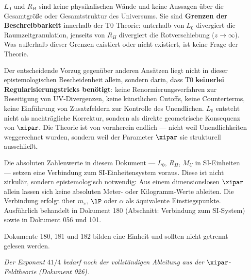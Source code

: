 \begin{foundation}
$L_0$ und $R_H$ sind keine physikalischen Wände und keine Aussagen über die Gesamtgröße oder Gesamtstruktur des Universums. Sie sind \textbf{Grenzen der Beschreibbarkeit} innerhalb der T0-Theorie: unterhalb von $L_0$ divergiert die Raumzeitgranulation, jenseits von $R_H$ divergiert die Rotverschiebung ($z \to \infty$). Was außerhalb dieser Grenzen existiert oder nicht existiert, ist keine Frage der Theorie.

Der entscheidende Vorzug gegenüber anderen Ansätzen liegt nicht in dieser epistemologischen Bescheidenheit allein, sondern darin, dass T0 \textbf{keinerlei Regularisierungstricks benötigt}: keine Renormierungsverfahren zur Beseitigung von UV-Divergenzen, keine künstlichen Cutoffs, keine Counterterms, keine Einführung von Zusatzfeldern zur Kontrolle des Unendlichen. $L_0$ entsteht nicht als nachträgliche Korrektur, sondern als direkte geometrische Konsequenz von $\xipar$. Die Theorie ist von vornherein endlich — nicht weil Unendlichkeiten weggerechnet wurden, sondern weil der Parameter $\xipar$ sie strukturell ausschließt.
\end{foundation}

\begin{foundation}
Die absoluten Zahlenwerte in diesem Dokument — $L_0$, $R_H$, $M_U$ in SI-Einheiten — setzen eine Verbindung zum SI-Einheitensystem voraus. Diese ist nicht zirkulär, sondern epistemologisch notwendig: Aus einem dimensionslosen $\xipar$ allein lassen sich keine absoluten Meter- oder Kilogramm-Werte ableiten. Die Verbindung erfolgt über $m_e$, $\lP$ oder $\alpha$ als äquivalente Einstiegspunkte. Ausführlich behandelt in Dokument 180 (Abschnitt: Verbindung zum SI-System) sowie in Dokument 056 und 101.

Dokumente 180, 181 und 182 bilden eine Einheit und sollten nicht getrennt gelesen werden.
\end{foundation}

\vspace{1cm}
\noindent\textit{Der Exponent $41/4$ bedarf noch der vollständigen Ableitung aus der $\xipar$-Feldtheorie (Dokument 026).}
